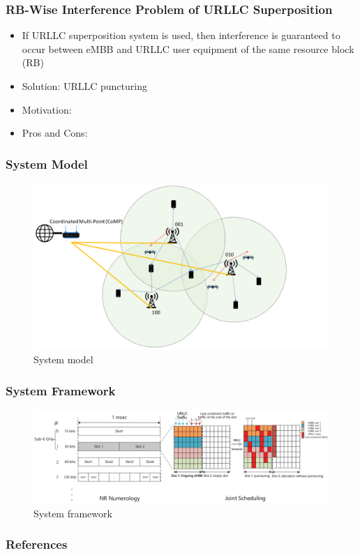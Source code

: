 \documentclass{beamer}
\begin{document}
\begin{frame}
  \frametitle{RB-Wise Interference Problem of URLLC Superposition}
  \begin{itemize}
    \item If URLLC superposition system is used, then interference is guaranteed to occur between eMBB and URLLC user equipment of the same resource block (RB)
    \item Solution: URLLC puncturing
    \item Motivation: \cite{urllcSuperpositionRefuse}
    \item Pros and Cons:
  \end{itemize}
\end{frame}

\begin{frame}
  \frametitle{System Model}
  \begin{figure}
    \includegraphics[width=\textwidth]{system_model}
    \caption{System model}
  \end{figure}
\end{frame}

\begin{frame}
  \frametitle{System Framework}
  \begin{figure}
    \includegraphics[width=\textwidth]{system_framework}
    \caption{System framework}
  \end{figure}
\end{frame}

\begin{frame}
  \frametitle{References}
  \printbibliography[heading=none]
\end{frame}
\end{document}
